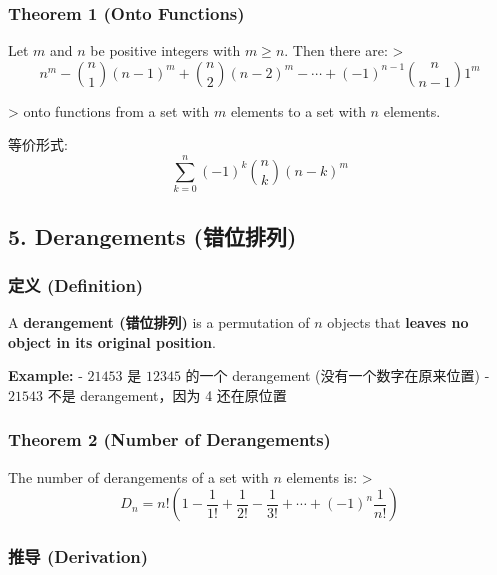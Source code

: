 \documentclass[10pt,a4paper,openany]{ctexbook}
\theoremstyle{definition}
\theoremstyle{remark}
\renewenvironment{quote}
  {\list{}{\leftmargin=1em\rightmargin=0pt\topsep=0.5pt\partopsep=0pt}\item[]}
  {\endlist}
\begin{document}
\vspace{-2pt}

\subsubsection{Theorem 1 (Onto Functions)}

\begin{quote}
Let $m$ and $n$ be positive integers with $m \ge n$. Then there are:
>
\[
n^m - \binom{n}{1}(n-1)^m + \binom{n}{2}(n-2)^m - \cdots + (-1)^{n-1}\binom{n}{n-1} 1^m
\]

>
onto functions from a set with $m$ elements to a set with $n$ elements.

等价形式:
\[
\sum_{k=0}^n (-1)^k \binom{n}{k} (n-k)^m
\]


\end{quote}
\vspace{-2pt}

\subsection{5. Derangements (错位排列)}

\subsubsection{定义 (Definition)}

\begin{quote}
A \textbf{derangement (错位排列)} is a permutation of $n$ objects that \textbf{leaves no object in its original position}.

\textbf{Example:}
- $21453$ 是 $12345$ 的一个 derangement (没有一个数字在原来位置)
- $21543$ 不是 derangement，因为 4 还在原位置

\end{quote}

\subsubsection{Theorem 2 (Number of Derangements)}

\begin{quote}
The number of derangements of a set with $n$ elements is:
>
\[
D_n = n! \left(1 - \frac{1}{1!} + \frac{1}{2!} - \frac{1}{3!} + \cdots + (-1)^n \frac{1}{n!}\right)
\]


\end{quote}

\subsubsection{推导 (Derivation)}
\end{document}
